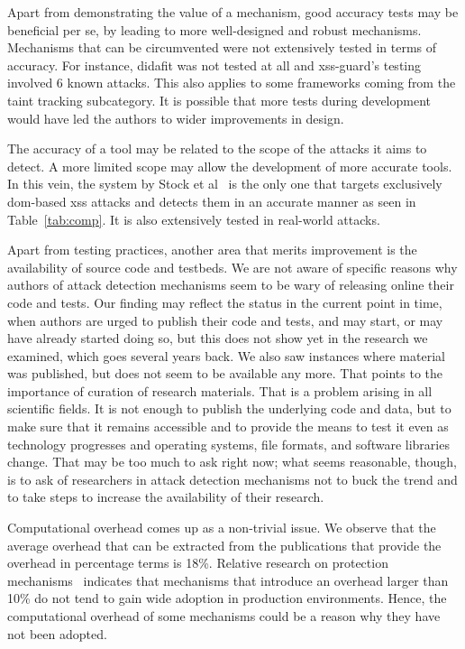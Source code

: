 \documentclass[conference]{IEEEtran}
\begin{document}
Apart from demonstrating the value of a mechanism, good accuracy tests
may be beneficial per se, by leading to more well-designed and robust
mechanisms. Mechanisms that can be circumvented were not extensively
tested in terms of accuracy. For instance, {\sc didafit} was not
tested at all and {\sc xss-guard}'s testing involved 6 known attacks.
This also applies to some frameworks coming from the taint tracking
subcategory. It is possible that more tests during development would
have led the authors to wider improvements in design. 

The accuracy of a tool may be related to the scope of the attacks it
aims to detect. A more limited scope may allow the development of more
accurate tools. In this vein, the system by Stock et al~\cite{SLMS14}
is the only one that targets exclusively {\sc dom}-based {\sc xss}
attacks and detects them in an accurate manner as seen in
Table~\ref{tab:comp}. It is also extensively tested in real-world
attacks.

Apart from testing practices, another area that merits improvement is
the availability of source code and testbeds. We are not aware of
specific reasons why authors of attack detection mechanisms seem to be
wary of releasing online their code and tests. Our finding may reflect
the status in the current point in time, when authors are urged to
publish their code and tests, and may start, or may have already
started doing so, but this does not show yet in the research we
examined, which goes several years back. We also saw instances where
material was published, but does not seem to be available any more.
That points to the importance of curation of research materials. That
is a problem arising in all scientific fields. It is not enough to
publish the underlying code and data, but to make sure that it remains
accessible and to provide the means to test it even as technology
progresses and operating systems, file formats, and software libraries
change. That may be too much to ask right now; what seems reasonable,
though, is to ask of researchers in attack detection mechanisms not to
buck the trend and to take steps to increase the availability of their
research.

Computational overhead comes up as a non-trivial issue. We observe
that the average overhead that can be extracted from the publications
that provide the overhead in percentage terms is 18\%. Relative
research on protection mechanisms~\cite{SPWS13} indicates that
mechanisms that introduce an overhead larger than 10\% do not tend to
gain wide adoption in production environments. Hence, the
computational overhead of some mechanisms could be a reason why they
have not been adopted.
\end{document}

